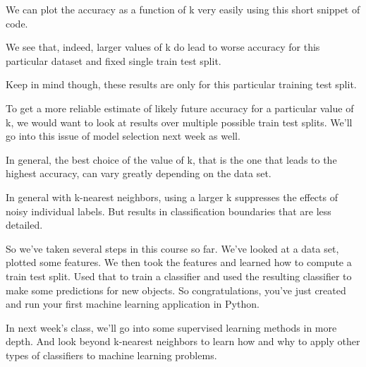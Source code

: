 \begin{multicols}{2}
We can plot the accuracy as a function of k very easily using this short snippet of code. 

We see that, indeed, larger values of k do lead to worse accuracy for this particular dataset and fixed single train test split. 

Keep in mind though, these results are only for this particular training test split. 

To get a more reliable estimate of likely future accuracy for a particular value of k, we would want to look at results over multiple possible train test splits. We'll go into this issue of model selection next week as well. 

In general, the best choice of the value of k, that is the one that leads to the highest accuracy, can vary greatly depending on the data set. 

In general with k-nearest neighbors, using a larger k suppresses the effects of noisy individual labels. But results in classification boundaries that are less detailed. 

So we've taken several steps in this course so far. We've looked at a data set, plotted some features. We then took the features and learned how to compute a train test split. Used that to train a classifier and used the resulting classifier to make some predictions for new objects. So congratulations, you've just created and run your first machine learning application in Python. 

In next week's class, we'll go into some supervised learning methods in more depth. And look beyond k-nearest neighbors to learn how and why to apply other types of classifiers to machine learning problems. 

\end{multicols}